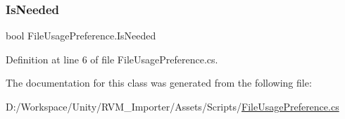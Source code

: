 \subsubsection{\texorpdfstring{IsNeeded}{IsNeeded}}
{\footnotesize\ttfamily bool File\+Usage\+Preference.\+Is\+Needed}



Definition at line 6 of file File\+Usage\+Preference.\+cs.



The documentation for this class was generated from the following file\+:\begin{DoxyCompactItemize}
\item 
D\+:/\+Workspace/\+Unity/\+R\+V\+M\+\_\+\+Importer/\+Assets/\+Scripts/\mbox{\hyperlink{_file_usage_preference_8cs}{File\+Usage\+Preference.\+cs}}\end{DoxyCompactItemize}
